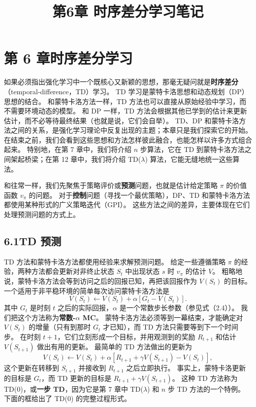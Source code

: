 \documentclass[UTF8,12pt,a4paper,fontset=fandol]{ctexart}
\title{第6章 时序差分学习笔记}
\author{}
\date{}
\begin{document}
\maketitle

\section*{第 6 章\quad 时序差分学习}

如果必须指出强化学习中一个既核心又新颖的思想，那毫无疑问就是\textbf{时序差分}（temporal-difference，TD）学习。
TD 学习是蒙特卡洛思想和动态规划（DP）思想的结合。
和蒙特卡洛方法一样，TD 方法也可以直接从原始经验中学习，而不需要环境动态的模型。
和 DP 一样，TD 方法会根据其他已学到的估计来更新估计，而不必等待最终结果（也就是说，它们会自举）。
TD、DP 和蒙特卡洛方法之间的关系，是强化学习理论中反复出现的主题；本章只是我们探索它的开始。
在结束之前，我们会看到这些思想和方法怎样彼此融合，也能怎样以许多方式组合起来。
特别地，在第 7 章中，我们将介绍 $n$ 步算法，它在 TD 到蒙特卡洛方法之间架起桥梁；在第 12 章中，我们将介绍 TD($\lambda$) 算法，它能无缝地统一这些算法。

和往常一样，我们先聚焦于策略评价或\textbf{预测}问题，也就是估计给定策略 $\pi$ 的价值函数 $v_\pi$ 的问题。
对于\textbf{控制}问题（寻找一个最优策略），DP、TD 和蒙特卡洛方法都使用某种形式的广义策略迭代（GPI）。
这些方法之间的差异，主要体现在它们处理预测问题的方式上。

\subsection*{6.1\quad TD 预测}

TD 方法和蒙特卡洛方法都使用经验来求解预测问题。
给定一些遵循策略 $\pi$ 的经验，两种方法都会更新对非终止状态 $S_t$ 中出现状态 $s$ 时 $v_\pi$ 的估计 $V$。
粗略地说，蒙特卡洛方法会等到访问之后的回报已知，再把该回报作为 $V(S_t)$ 的目标。
一个适用于非平稳环境的简单每次访问蒙特卡洛方法是
\begin{equation}
V(S_t)\leftarrow V(S_t)+\alpha\left[G_t-V(S_t)\right].
\end{equation}
其中 $G_t$ 是时刻 $t$ 之后的实际回报，$\alpha$ 是一个常数步长参数（参见式（2.4））。
我们把这个方法称为\textbf{常数-$\alpha$ MC}。
蒙特卡洛方法必须等到一幕结束，才能确定对 $V(S_t)$ 的增量（只有到那时 $G_t$ 才已知），而 TD 方法只需要等到下一个时间步。
在时刻 $t+1$，它们立刻形成一个目标，并用观测到的奖励 $R_{t+1}$ 和估计 $V(S_{t+1})$ 做出有用的更新。
最简单的 TD 方法做出的更新为
\begin{equation}
V(S_t)\leftarrow V(S_t)+\alpha\left[R_{t+1}+\gamma V(S_{t+1})-V(S_t)\right],
\end{equation}
这个更新在转移到 $S_{t+1}$ 并接收到 $R_{t+1}$ 之后立即执行。
事实上，蒙特卡洛更新的目标是 $G_t$，而 TD 更新的目标是 $R_{t+1}+\gamma V(S_{t+1})$。
这种 TD 方法称为 TD(0)，或\textbf{一步 TD}，因为它是第 7 章中 TD($\lambda$) 和 $n$ 步 TD 方法的一个特例。
下面的框给出了 TD(0) 的完整过程形式。
\end{document}
